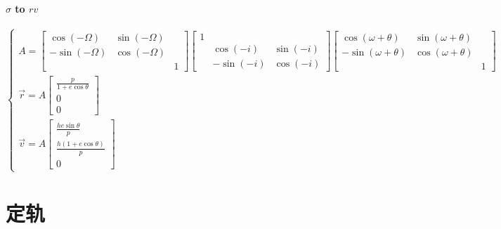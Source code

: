 \documentclass[UTF8]{ctexart}
\begin{document}
\paragraph{$\sigma$ to $rv$}
\begin{equation}
	\begin{cases}
			A=\begin{bmatrix}
			\cos(-\Omega) & \sin(-\Omega) & \\
			-\sin(-\Omega) & \cos(-\Omega) & \\
			& & 1
		\end{bmatrix}\begin{bmatrix}
			1 & &\\
			& \cos(-i) & \sin(-i)\\
			& -\sin(-i) & \cos(-i)
		\end{bmatrix}\begin{bmatrix}
			\cos(\omega+\theta) & \sin(\omega+\theta) & \\
			-\sin(\omega+\theta) & \cos(\omega+\theta) &\\
			& & 1
		\end{bmatrix}\\
		\vec{r}=A\begin{bmatrix}
			\frac{p}{1+e\cos\theta}\\
			0\\
			0
		\end{bmatrix}\\
		\vec{v}=A\begin{bmatrix}
		\frac{he\sin\theta}{p}\\
		\frac{h(1+e\cos\theta)}{p}\\
		0
		\end{bmatrix}
	\end{cases}
\end{equation}

\section{定轨}

\end{document}

